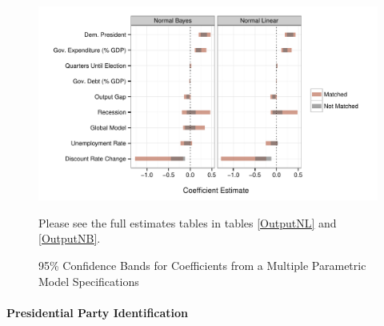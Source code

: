 \documentclass[a4paper]{article}\usepackage[]{graphicx}\usepackage[]{color}
\newenvironment{knitrout}{}{} %
\begin{document}
\begin{figure}[t]
    \caption{95\% Confidence Bands for Coefficients from a Multiple Parametric Model Specifications}
    \label{CoefComparePlots}
    \begin{center}

\begin{knitrout}
\color{fgcolor}

{\centering \includegraphics[width=0.95\linewidth]{figure/CoefComparePlots} 

}



\end{knitrout}

    \end{center}
    \begin{singlespace}
        {\scriptsize{Please see the full estimates tables in tables \ref{OutputNL} and \ref{OutputNB}.}}
    \end{singlespace}
\end{figure}

\paragraph{Presidential Party Identification}
\end{document}
